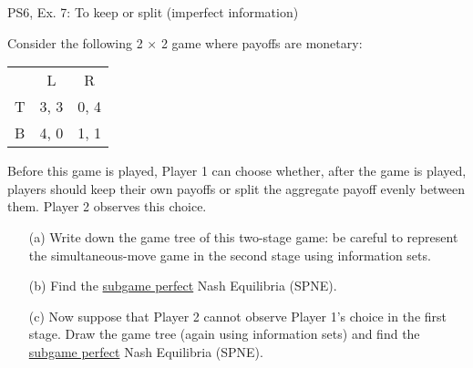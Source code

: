 \begin{frame}{PS6, Ex. 7: To keep or split (imperfect information)}
  \begin{multicols}{2}
    Consider the following 2 × 2 game where payoffs are monetary:
    \begin{table}
      \begin{tabular}{l|c|c|}
          \multicolumn{1}{c}{} & \multicolumn{1}{c}{L} & \multicolumn{1}{c}{R} \\\cline{2-3}
          T & 3, 3 & 0, 4 \\\cline{2-3}
          B & 4, 0 & 1, 1 \\\cline{2-3}
      \end{tabular}
    \end{table}
    Before this game is played, Player 1 can choose whether, after the game is played, players should keep their own payoffs or split the aggregate payoff evenly between them. Player 2 observes this choice.
  \vfill\null \columnbreak
    \begin{itemize}
      \item[(a)] Write down the game tree of this two-stage game: be careful to represent the simultaneous-move game in the second stage using information sets.
      \item[(b)] Find the \underline{subgame perfect} Nash Equilibria (SPNE).
      \item[(c)] Now suppose that Player 2 cannot observe Player 1’s choice in the first stage. Draw the game tree (again using information sets) and find the \underline{subgame perfect} Nash Equilibria (SPNE).
    \end{itemize}
  \vfill\null
  \end{multicols}
\end{frame}


